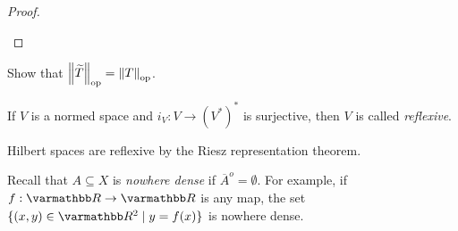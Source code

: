 \begin{proof}
\begin{center}
                \end{center}
            
        \end{proof}

    \begin{exercise}
        Show that $\left\lVert \widetilde{T} \right\rVert_{\operatorname{op}} = \left\lVert T \right\rVert_{\operatorname{op}}$.
    \end{exercise}

    \begin{definition}
        If $V$ is a normed space and $i_V:V \rightarrow \left( V^\ast \right)^\ast$ is surjective, then $V$ is called \textit{reflexive}.
    \end{definition}

    \begin{example}
        Hilbert spaces are reflexive by the Riesz representation theorem.
    \end{example}

    \begin{center}
    \end{center}

    Recall that $A \subseteq X$ is \textit{nowhere dense} if $\overline{A}^o = \emptyset$. For example, if $f:\bfR \rightarrow \bfR$ is any map, the set $\{(x,y) \in \bfR^2 \mid y = f(x)\}$ is nowhere dense.

